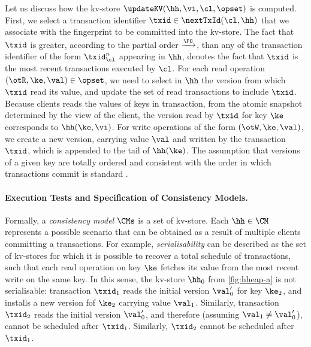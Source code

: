 Let us discuss how the kv-store $\updateKV(\hh, \vi, \cl, \opset)$ is computed. 
First, we select a transaction identifier $\txid \in \nextTxId(\cl, \hh)$ that we associate 
with the fingerprint to be committed into the kv-store. The fact that $\txid$ is greater, 
according to the partial order $\xrightarrow{\PO}$, than any of the transaction identifier 
of the form $\txid_{\cl}^{n}$ appearing in $\hh$, denotes the fact that $\txid$ is the 
most recent transactions executed by $\cl$.
For each read operation $(\otR, \ke, \val) \in \opset$, we need to select in $\hh$ the version 
from which $\txid$ read its value, and update the set of read transactions to include $\txid$. 
Because clients reads the values of keys in transaction, from the atomic 
snapshot determined by the view of the client, the version read by $\txid$ for key $\ke$ 
corresponds to $\hh(\ke, \vi)$. For write operations of the form $(\otW, \ke, \val)$, 
we create a new version, carrying value $\val$ and written by the transaction $\txid$, 
which is appended to the tail of $\hh(\ke)$. The assumption that versions of 
a given key are totally ordered and consistent with the order in which 
transactions commit is standard \cite{adya,framework-concur,seebelieve}. 

\paragraph{Execution Tests and Specification of Consistency Models.}
Formally, a \emph{consistency model} $\CMs$ is a 
set of kv-store. Each $\hh \in \CM$ represents a possible scenario that 
can be obtained as a result of multiple clients committing a transactions. 
For example, \emph{serialisability} can be described as the set 
of kv-stores for which it is possible to recover a total schedule of transactions, 
such that each read operation on key $\ke$ fetches its value from the 
most recent write on the same key.
In this sense, the kv-store $\hh_0$ from \cref{fig:hheap-a} is not serialisable: 
transaction $\txid_1$ reads the initial version $\val'_0$ for key $\ke_{2}$, 
and installs a new version fof $\ke_{2}$ carrying value $\val_1$. Similarly, transaction $\txid_2$ 
reads the initial version $\val'_0$, and therefore (assuming $\val_1 \neq \val'_0$), 
cannot be scheduled after $\txid_1$. Similarly, $\txid_2$ cannot be scheduled after $\txid_1$.

